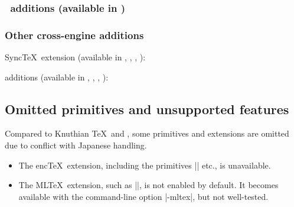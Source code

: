 \documentclass[a4paper,11pt,dvipdfmx]{article}
\begin{document}
\subsubsection{\eupTeX\ additions (available in \eupTeX)}
\begin{simplelist}
\end{simplelist}

\subsubsection{Other cross-engine additions}
Sync\TeX\ extension (available in \pTeX, \upTeX, \epTeX, \eupTeX):
\begin{simplelist}
 \csitem[\.{synctex}]
\end{simplelist}

\noindent
\TL additions (available in \pTeX, \upTeX, \epTeX, \eupTeX):
\begin{simplelist}
\end{simplelist}


\subsection{Omitted primitives and unsupported features}

Compared to Knuthian \TeX\ and \eTeX, some primitives and extensions are
omitted due to conflict with Japanese handling.
\begin{itemize}
 \item The enc\TeX\ extension, including the primitives |\mubyte| etc.,
  is unavailable.
 \item The ML\TeX\ extension, such as |\charsubdef|, is not enabled
  by default. It becomes available with the command-line option |-mltex|,
  but not well-tested.
\end{itemize}
\end{document}
